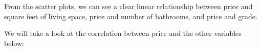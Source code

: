 \documentclass[11pt]{article}
\begin{document}
    \begin{center}
    \end{center}
    { \hspace*{\fill} \\}
    
    \begin{center}
    \end{center}
    { \hspace*{\fill} \\}
    
    \begin{center}
    \end{center}
    { \hspace*{\fill} \\}
    
    \begin{center}
    \end{center}
    { \hspace*{\fill} \\}
    
    \begin{center}
    \end{center}
    { \hspace*{\fill} \\}
    
    From the scatter plots, we can see a clear linear relationship between
price and square feet of living space, price and number of bathrooms,
and price and grade.

We will take a look at the correlation between price and the other
variables below:
\end{document}
